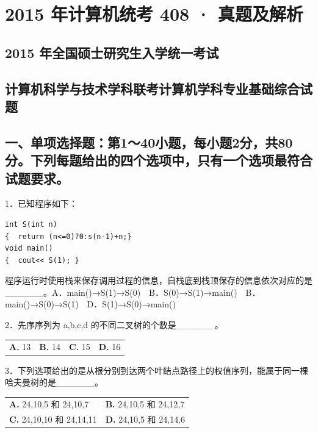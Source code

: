 \documentclass[UTF8,11pt]{ctexart}
\begin{document}
\section*{2015 年计算机统考 408 · 真题及解析}
\subsection*{2015 年全国硕士研究生入学统一考试}

\subsection*{计算机科学与技术学科联考计算机学科专业基础综合试题}

\subsection*{一、单项选择题：第1～40小题，每小题2分，共80分。下列每题给出的四个选项中，只有一个选项最符合试题要求。}

1．已知程序如下：


\begin{Verbatim}[breaklines,breakanywhere,fontsize=\small]
int S(int n)
{  return (n<=0)?0:s(n-1)+n;}
void main()
{  cout<< S(1); }
\end{Verbatim}

程序运行时使用栈来保存调用过程的信息，自栈底到栈顶保存的信息依次对应的是\_\_\_\_\_\_。A．main()→S(1)→S(0)　B．S(0)→S(1)→main()　B．main()→S(0)→S(1)　D．S(1)→S(0)→main()


2．先序序列为 a,b,c,d 的不同二叉树的个数是\_\_\_\_\_\_。


\begin{center}\begin{tabular}{>{\raggedright\arraybackslash}p{\dimexpr(\linewidth-8\tabcolsep)/4\relax}>{\raggedright\arraybackslash}p{\dimexpr(\linewidth-8\tabcolsep)/4\relax}>{\raggedright\arraybackslash}p{\dimexpr(\linewidth-8\tabcolsep)/4\relax}>{\raggedright\arraybackslash}p{\dimexpr(\linewidth-8\tabcolsep)/4\relax}}
\textbf{A.} 13 & \textbf{B.} 14 & \textbf{C.} 15 & \textbf{D.} 16\\[.35em]\end{tabular}\end{center}

3．下列选项给出的是从根分别到达两个叶结点路径上的权值序列，能属于同一棵哈夫曼树的是\_\_\_\_\_\_。


\begin{center}\begin{tabular}{>{\raggedright\arraybackslash}p{\dimexpr(\linewidth-4\tabcolsep)/2\relax}>{\raggedright\arraybackslash}p{\dimexpr(\linewidth-4\tabcolsep)/2\relax}}
\textbf{A.} 24,10,5 和 24,10,7 & \textbf{B.} 24,10,5 和 24,12,7\\[.35em]
\textbf{C.} 24,10,10 和 24,14,11 & \textbf{D.} 24,10,5 和 24,14,6\\[.35em]\end{tabular}\end{center}
\end{document}
